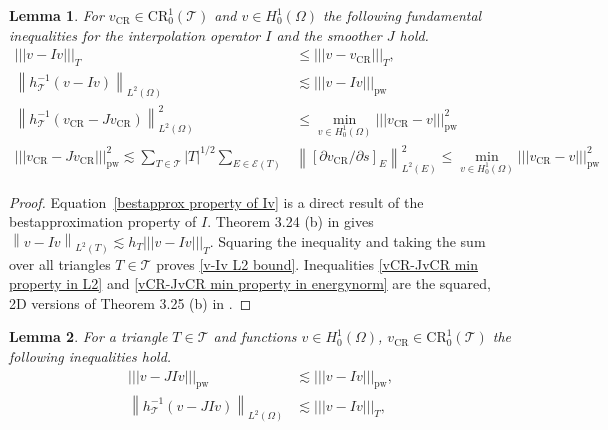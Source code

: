 \documentclass[11pt,a4paper]{article}
\newcommand{\vCR}{v_{\mathrm{CR}}}
\newcommand{\norm}[1]{\left \lVert #1 \right \rVert}
\newcommand{\Ltwo}[2]{\left\lVert #1 \right\rVert_{L^2(#2)}}
\newcommand{\enorm}[1]{\left\lvert\!\left\lvert\!\left\lvert #1 \right\rvert\!\right\rvert\!\right\rvert}
\newcommand{\pwenorm}[1]{\left\lvert\!\left\lvert\!\left\lvert #1 \right\rvert\!\right\rvert\!\right\rvert_{\mathrm{pw}}}
\newcommand{\CR}{\mathrm{CR}^1_0(\mathcal{T})}
\newtheorem{lemma}{Lemma}
\begin{document}
\begin{lemma} \label{lemma: fundamental inequalities for I and J}
For \(\vCR \in \CR\) and \(v \in H^1_0(\Omega)\) the following fundamental inequalities for the interpolation operator \(I\) and the smoother \(J\) hold.
\begin{align}
\enorm{v-Iv}_T &\le \enorm{v - \vCR}_T,   \label{bestapprox property of Iv} \\
\Ltwo{h_\mathcal{T}^{-1} (v-Iv)}{\Omega} &\lesssim \pwenorm{v-Iv} \label{v-Iv L2 bound} \\
\Ltwo{h_\mathcal{T}^{-1} (\vCR - J\vCR)}{\Omega}^2 &\le \min_{v \in H^1_0(\Omega)} \pwenorm{\vCR - v}^2 \label{vCR-JvCR min property in L2} \\
\pwenorm{\vCR - J\vCR}^2 \lesssim \sum_{T \in \mathcal{T}}|T|^{1/2} \sum_{E \in \mathcal{E}(T)}&\norm{[\partial \vCR/\partial s]_E}^2_{L^2(E)} \le \min_{v \in H^1_0(\Omega)} \pwenorm{\vCR - v}^2 \label{vCR-JvCR min property in energynorm}
\end{align}
\end{lemma}
\begin{proof}
Equation~\eqref{bestapprox property of Iv} is a direct result of the bestapproximation property of \(I\). Theorem 3.24 (b) in \cite[p.61]{Puttkammer2023} gives \(\Ltwo{v-Iv}{T} \lesssim h_T \enorm{v-Iv}_T\). Squaring the inequality and taking the sum over all triangles \(T \in \mathcal{T}\) proves \eqref{v-Iv L2 bound}. Inequalities \eqref{vCR-JvCR min property in L2} and \eqref{vCR-JvCR min property in energynorm} are the squared, 2D versions of Theorem 3.25 (b) in \cite[p.62]{Puttkammer2023}.
\end{proof}
\begin{lemma}
\label{lemma: inequalities for I and J}
For a triangle \(T \in \mathcal{T}\) and functions \(v \in H^1_0(\Omega)\), \(\vCR \in \CR\) the following inequalities hold.
\begin{align}
\pwenorm{v - JIv} &\lesssim \pwenorm{v - Iv}, \label{v-JIv enormbound} \\
\Ltwo{h_{\mathcal{T}}^{-1}(v - JIv)}{\Omega} &\lesssim \enorm{v - Iv}_T, \label{v-JIv L2bound}
\end{align}
\end{lemma}
\end{document}
